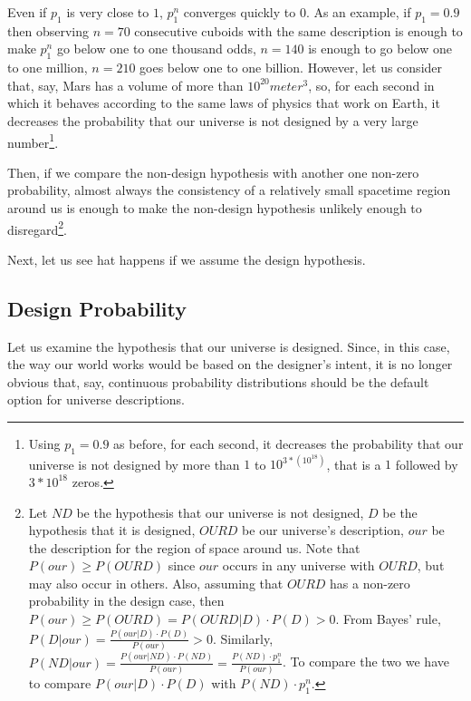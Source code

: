 \documentclass[a4paper
,draft
]{article}
\def\our_description{OURD}
\begin{document}
Even if $p_1$ is very close to $1$, $p_1^n$ converges quickly to $0$.
As an example, if $p_1=0.9$ then observing $n=70$ consecutive cuboids with
the same description is enough to make $p_1^n$ go below one to one thousand
odds, $n=140$ is enough to go below one to one million,
$n=210$ goes below one to one billion. However, let us consider that, say,
Mars has a volume of more than $10^{20} meter^3$, so, for each second
in which it behaves according to the same laws of physics that work on
Earth, it decreases the probability that our universe is not designed by a
very large number\footnote{Using $p_1=0.9$ as before, for each second,
it decreases the
probability that our universe is not designed by more than $1$ to
$10^{3*(10^{18})}$, that is a $1$ followed by $3*10^{18}$ zeros.}.

Then, if we compare the non-design hypothesis
with another one non-zero probability,
almost always the consistency of a relatively small spacetime region around us
is enough to make the non-design hypothesis unlikely enough to
disregard\footnote{
  Let $ND$ be the hypothesis that our universe is not designed,
  $D$ be the hypothesis that it is designed, $\our_description$ be our
  universe's description,
  $our$ be the description for the region of space around us.
  Note that $P(our) \ge P(\our_description)$ since $our$ occurs in any
  universe with $\our_description$, but may also occur in others. Also, assuming
  that $\our_description$ has a non-zero probability in the design case, then
  $P(our) \ge P(\our_description)=P(\our_description|D)\cdot P(D) > 0$.
  From Bayes' rule, $P(D|our) = \frac{P(our|D)\cdot P(D)}{P(our)} > 0$.
  Similarly,
  $P(ND|our) = \frac{P(our|ND)\cdot P(ND)}{P(our)}
    = \frac{P(ND) \cdot p_1^n}{P(our)}$.
  To compare the two we have to compare
  $P(our|D)\cdot P(D)$ with $P(ND) \cdot p_1^n$.
  }.

Next, let us see hat happens if we assume the design hypothesis.

\subsection{Design Probability}
\label{sec:design-probability}

Let us examine the hypothesis that our universe is designed.
Since, in this case, the way our world works would be based
on the designer's intent,
it is no longer obvious that, say, continuous probability distributions
should be the default option for universe descriptions.
\end{document}
